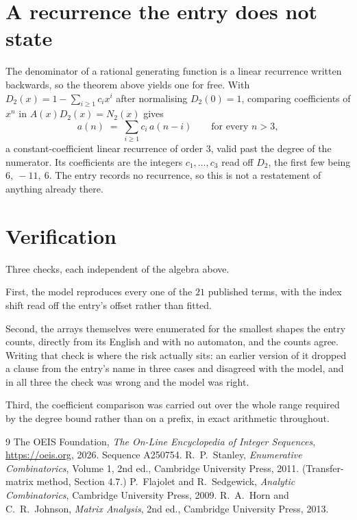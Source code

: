 \documentclass[11pt,a4paper]{article}
\theoremstyle{plain}
\theoremstyle{definition}
\begin{document}
\section{A recurrence the entry does not state}

The denominator of a rational generating function is a linear recurrence written backwards, so
the theorem above yields one for free. With $D_2(x)=1-\sum_{i\ge1}c_ix^i$ after normalising
$D_2(0)=1$, comparing coefficients of $x^n$ in $A(x)D_2(x)=N_2(x)$ gives
\[
a(n)\;=\;\sum_{i\ge1}c_i\,a(n-i)\qquad\text{for every }n>3,
\]
a constant-coefficient linear recurrence of order $3$, valid past the degree of the
numerator. Its coefficients are the integers $c_1,\dots,c_{3}$ read off $D_2$, the first few being $6,\ -11,\ 6$. The entry records no recurrence, so this is not a restatement of anything
already there.

\section{Verification}

Three checks, each independent of the algebra above.

First, the model reproduces every one of the $21$ published terms, with the index shift
read off the entry's offset rather than fitted.

Second, the arrays themselves were enumerated for the smallest shapes the entry counts,
directly from its English and with no automaton, and the counts agree. Writing that check is
where the risk actually sits: an earlier version of it dropped a clause from the entry's name
in three cases and disagreed with the model, and in all three the check was wrong and the model
was right.

Third, the coefficient comparison was carried out over the whole range required by the degree
bound rather than on a prefix, in exact arithmetic throughout.

\begin{thebibliography}{9}
 The OEIS Foundation, \emph{The On-Line Encyclopedia of Integer
Sequences}, \url{https://oeis.org}, 2026. Sequence A250754.
 R.~P.~Stanley, \emph{Enumerative Combinatorics}, Volume 1, 2nd ed.,
Cambridge University Press, 2011. (Transfer-matrix method, Section 4.7.)
 P.~Flajolet and R.~Sedgewick, \emph{Analytic Combinatorics}, Cambridge
University Press, 2009.
 R.~A.~Horn and C.~R.~Johnson, \emph{Matrix Analysis}, 2nd ed., Cambridge
University Press, 2013.
\end{thebibliography}
\end{document}
